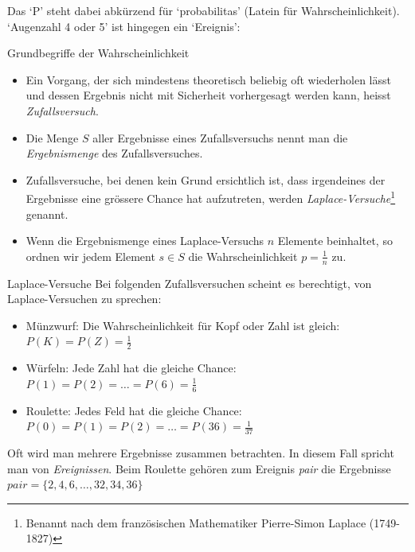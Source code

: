 Das `P' steht dabei abkürzend für `probabilitas' (Latein für Wahrscheinlichkeit). `Augenzahl 4 oder 5' ist hingegen ein `Ereignis':

\begin{definition}
    {Grundbegriffe der Wahrscheinlichkeit}{}
    \begin{itemize}
        \item  Ein Vorgang, der sich mindestens theoretisch beliebig oft wiederholen lässt und dessen Ergebnis nicht mit Sicherheit vorhergesagt werden kann, heisst \emph{Zufallsversuch}.
    
        \item Die Menge $S$ aller Ergebnisse eines Zufallsversuchs nennt man die \emph{Ergebnismenge} des Zufallsversuches.
        
    
        \item Zufallsversuche, bei denen kein Grund ersichtlich ist, dass irgendeines der Ergebnisse eine grössere Chance hat aufzutreten, werden \emph{Laplace-Versuche}\footnote{Benannt nach dem französischen Mathematiker Pierre-Simon Laplace (1749-1827)} genannt.
    
        \item Wenn die Ergebnismenge eines Laplace-Versuchs $n$ Elemente beinhaltet, so ordnen wir jedem Element $s \in S$ die Wahrscheinlichkeit $p=\frac{1}{n}$ zu.
    
    \end{itemize}
   
\end{definition}

\begin{bsp}
{Laplace-Versuche}{}
Bei folgenden Zufallsversuchen scheint es berechtigt, von Laplace-Versuchen zu sprechen:

\begin{itemize}
    \item 	Münzwurf: Die Wahrscheinlichkeit für Kopf oder Zahl ist gleich: $P(K)=P(Z)= \frac{1}{2}$
    \item 	Würfeln: Jede Zahl hat die gleiche Chance: $P(1)=P(2)=\dots=P(6)=\frac{1}{6}$
    \item 	Roulette: Jedes Feld hat die gleiche Chance: $P(0)=P(1)=P(2)=\dots = P(36)=\frac{1}{37}$
\end{itemize}
\end{bsp}

Oft wird man mehrere Ergebnisse zusammen betrachten. In diesem Fall spricht man von \emph{Ereignissen}. Beim Roulette gehören zum Ereignis \emph{pair} die Ergebnisse $pair=\{2,4,6,\dots,32,34,36\}$

